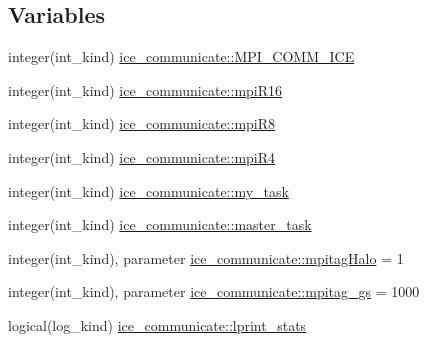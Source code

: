 \subsection*{Variables}
\begin{DoxyCompactItemize}
\item 
integer(int\_\-kind) \hyperlink{namespaceice__communicate_ad2224da9473c4376695684ddb19ec66f}{ice\_\-communicate::MPI\_\-COMM\_\-ICE}
\item 
integer(int\_\-kind) \hyperlink{namespaceice__communicate_a817450a2b9532a4c7acb648ef5c1a8a4}{ice\_\-communicate::mpiR16}
\item 
integer(int\_\-kind) \hyperlink{namespaceice__communicate_a935c7b05783b45e8b2465e9e671290f8}{ice\_\-communicate::mpiR8}
\item 
integer(int\_\-kind) \hyperlink{namespaceice__communicate_a0f8744049bd83997c68c5181972a7930}{ice\_\-communicate::mpiR4}
\item 
integer(int\_\-kind) \hyperlink{namespaceice__communicate_a70e729e746e2e5ec592ccba505136002}{ice\_\-communicate::my\_\-task}
\item 
integer(int\_\-kind) \hyperlink{namespaceice__communicate_a769a45947743f12c592e4cef37a18b6c}{ice\_\-communicate::master\_\-task}
\item 
integer(int\_\-kind), parameter \hyperlink{namespaceice__communicate_abf79852ee48a5d30f16dffad09f5b9e1}{ice\_\-communicate::mpitagHalo} = 1
\item 
integer(int\_\-kind), parameter \hyperlink{namespaceice__communicate_a33a81d2a5d816dcfde8d2232e1f1b80e}{ice\_\-communicate::mpitag\_\-gs} = 1000
\item 
logical(log\_\-kind) \hyperlink{namespaceice__communicate_a6dd078fb822abac232bfb22bab20ec64}{ice\_\-communicate::lprint\_\-stats}
\end{DoxyCompactItemize}
